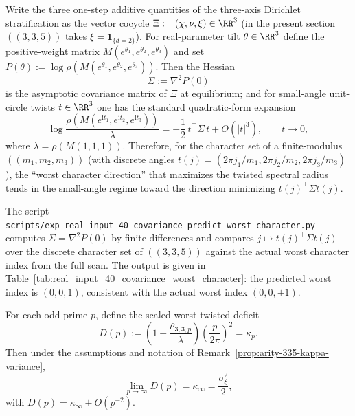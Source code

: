 \begin{remark}\label{prop:arity-335-worst-direction-cov}
Write the three one-step additive quantities of the three-axis Dirichlet stratification as the vector cocycle
\(
\Xi:=(\chi,\nu,\xi)\in\RR^3
\)
(in the present section \(((3,3,5))\) takes \(\xi=\mathbf{1}_{\{d=2\}}\)).
For real-parameter tilt \(\theta\in\RR^3\) define the positive-weight matrix \(M(e^{\theta_1},e^{\theta_2},e^{\theta_3})\) and set
\(
P(\theta):=\log\rho(M(e^{\theta_1},e^{\theta_2},e^{\theta_3}))
\).
Then the Hessian
\[
\Sigma:=\nabla^2 P(0)
\]
is the asymptotic covariance matrix of \(\Xi\) at equilibrium; and for small-angle unit-circle twists \(t\in\RR^3\) one has the standard quadratic-form expansion
\[
\log\frac{\rho(M(e^{\mathrm{i}t_1},e^{\mathrm{i}t_2},e^{\mathrm{i}t_3}))}{\lambda}
=
-\frac12\,t^\top\Sigma\,t
+O(|t|^3),
\qquad t\to 0,
\]
where \(\lambda=\rho(M(1,1,1))\).
Therefore, for the character set of a finite-modulus \(((m_1,m_2,m_3))\) (with discrete angles \(t(j)=(2\pi j_1/m_1,2\pi j_2/m_2,2\pi j_3/m_3)\)), the ``worst character direction'' that maximizes the twisted spectral radius tends in the small-angle regime toward the direction minimizing \(t(j)^\top\Sigma t(j)\).
\end{remark}

\begin{remark}\label{rem:arity-335-worst-direction-cov-check}
The script \texttt{scripts/exp\_real\_input\_40\_covariance\_predict\_worst\_character.py} computes \(\Sigma=\nabla^2P(0)\) by finite differences and compares
\(
j\mapsto t(j)^\top\Sigma t(j)
\)
over the discrete character set of \(((3,3,5))\) against the actual worst character index from the full scan. The output is given in Table~\ref{tab:real_input_40_covariance_worst_character}: the predicted worst index is \((0,0,1)\), consistent with the actual worst index \((0,0,\pm1)\).
\end{remark}





\begin{remark}\label{thm:arity-335-limit-law}
For each odd prime \(p\), define the scaled worst twisted deficit
$$
D(p)
:=
\left(1-\frac{\rho_{3,3,p}}{\lambda}\right)\left(\frac{p}{2\pi}\right)^2
=\kappa_p.
$$
Then under the assumptions and notation of Remark~\ref{prop:arity-335-kappa-variance},
$$
\lim_{p\to\infty}D(p)=\kappa_\infty=\frac{\sigma_\xi^2}{2},
$$
with \(D(p)=\kappa_\infty+O(p^{-2})\).
\end{remark}

